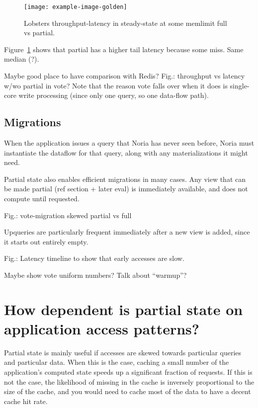 \begin{figure}[h]
  \centering
  \texttt{[image: example-image-golden]}
  \caption{Lobsters throughput-latency in steady-state at some memlimit full vs partial.}
  \label{f:lobsters-throughput-latency-steady-full-partial}
\end{figure}

\begin{inprogress}
Figure~\ref{f:lobsters-throughput-latency-steady-full-partial} shows that
partial has a higher tail latency because some miss. Same median (?).
\end{inprogress}

\begin{inprogress}
Maybe good place to have comparison with Redis?
Fig.: throughput vs latency w/wo partial in vote?
Note that the reason vote falls over when it does is single-core write
processing (since only one query, so one data-flow path).
\end{inprogress}

\subsection{Migrations}
\label{s:eval:cost:mig}

When the application issues a query that Noria has never seen before, Noria must
instantiate the dataflow for that query, along with any materializations it
might need.

Partial state also enables efficient migrations in many cases. Any view
that can be made partial (ref section + later eval) is immediately
available, and does not compute until requested.

Fig.: vote-migration skewed partial vs full

Upqueries are particularly frequent immediately after a new view is added, since
it starts out entirely empty.

Fig.: Latency timeline to show that early accesses are slow.

\begin{inprogress}
Maybe show vote uniform numbers? Talk about ``warmup''?
\end{inprogress}

\section{How dependent is partial state on application access patterns?}
\label{s:eval:patterns}

Partial state is mainly useful if accesses are skewed towards particular queries
and particular data. When this is the case, caching a small number of the
application's computed state speeds up a significant fraction of requests. If
this is not the case, the likelihood of missing in the cache is inversely
proportional to the size of the cache, and you would need to cache most of the
data to have a decent cache hit rate.

